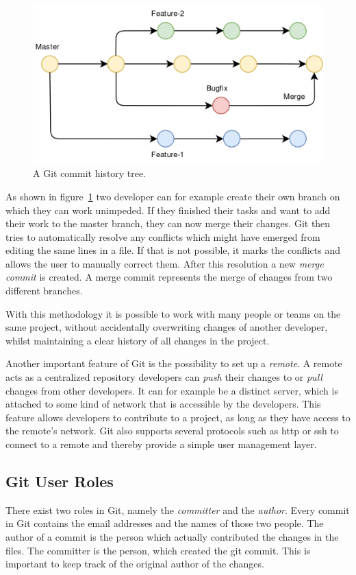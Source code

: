 \begin{figure}[H]
    \includegraphics[scale=0.35]{./graphs/git-history-branch}
    \centering
    \caption{A Git commit history tree.}\label{fig:git-commit-tree}
\end{figure}

As shown in figure~\ref{fig:git-commit-tree} two developer can for example create their own branch on which they can work unimpeded.
If they finished their tasks and want to add their work to the master branch, they can now merge their changes.
Git then tries to automatically resolve any conflicts which might have emerged from editing the same lines in a file.
If that is not possible, it marks the conflicts and allows the user to manually correct them.
After this resolution a new \emph{merge commit} is created. A merge commit represents the merge of changes from two different branches.

With this methodology it is possible to work with many people or teams on the same project, without accidentally overwriting changes of another developer, whilst maintaining a clear history of all changes in the project.

Another important feature of Git is the possibility to set up a \emph{remote}.
A remote acts as a centralized repository developers can \emph{push} their changes to or \emph{pull} changes from other developers.
It can for example be a distinct server, which is attached to some kind of network that is accessible by the developers.
This feature allows developers to contribute to a project, as long as they have access to the remote's network.
Git also supports several protocols such as \ac{http} or \ac{ssh} to connect to a remote and thereby provide a simple user management layer.


\subsection{Git User Roles}
There exist two roles in Git, namely the \emph{committer} and the \emph{author}.
Every commit in Git contains the email addresses and the names of those two people.
The author of a commit is the person which actually contributed the changes in the files.
The committer is the person, which created the git commit.
This is important to keep track of the original author of the changes.

